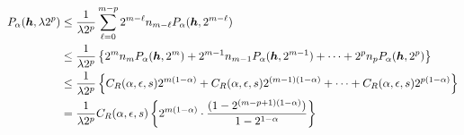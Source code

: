 \documentclass{amsart}
\begin{document}
\begin{align*}
    P_\alpha(\vh,\lambda 2^p) 
    & \le \frac {1}{\lambda 2^p} \sum_{\ell = 0}^{m-p} 2^{m-\ell} n_{m -\ell} P_\alpha(\vh,2^{m-\ell}) \\
    & \le \frac {1}{\lambda 2^p} \left\{2^m n_m P_\alpha(\vh,2^m) + 2^{m-1} n_{m-1} P_\alpha(\vh,2^{m-1}) + \cdots + 2^p n_p P_\alpha(\vh,2^p) %
    \right\} \\ %
    & \le \frac {1}{\lambda 2^p} \left\{C_{R}(\alpha,\epsilon,s) 2^{m(1-\alpha)} + C_{R}(\alpha,\epsilon,s) 2^{(m-1)(1-\alpha)} + \cdots +  C_{R}(\alpha,\epsilon,s) 2^{p(1-\alpha)}\right\} \\
    & = \frac {1}{\lambda 2^p} C_{R}(\alpha,\epsilon,s) \left\{ 2^{m(1-\alpha)} \cdot \frac{(1 - 2^{(m-p+1)(1-\alpha)})}{1 - 2^{1-\alpha}}\right\} 
\end{align*}




\end{document}
